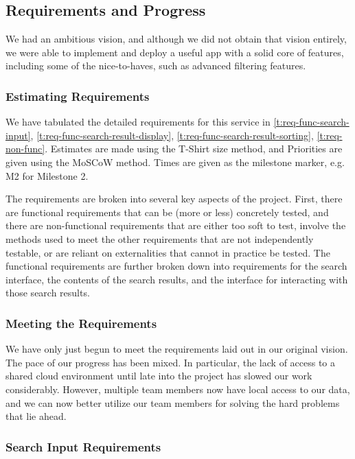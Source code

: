 \subsection{Requirements and Progress}

We had an ambitious vision, and although we did not obtain that vision entirely, we were able to implement and deploy a useful app with a solid core of features, including some of the nice-to-haves, such as advanced filtering features.

\subsubsection{Estimating Requirements}

We have tabulated the detailed requirements for this service in \autoref{t:req-func-search-input}, \autoref{t:req-func-search-result-display}, \autoref{t:req-func-search-result-sorting}, \autoref{t:req-non-func}. Estimates are made using the T-Shirt size method, and Priorities are given using the MoSCoW method. Times are given as the milestone marker, e.g. M2 for Milestone 2.

The requirements are broken into several key aspects of the project. First, there are functional requirements that can be (more or less) concretely tested, and there are non-functional requirements that are either too soft to test, involve the methods used to meet the other requirements that are not independently testable, or are reliant on externalities that cannot in practice be tested. The functional requirements are further broken down into requirements for the search interface, the contents of the search results, and the interface for interacting with those search results.

\subsubsection{Meeting the Requirements}

We have only just begun to meet the requirements laid out in our original vision. The pace of our progress has been mixed. In particular, the lack of access to a shared cloud environment until late into the project has slowed our work considerably. However, multiple team members now have local access to our data, and we can now better utilize our team members for solving the hard problems that lie ahead.

\def\requirementwidth{11.3cm}
\def\matrixwidth{1.3cm}

\subsubsection{Search Input Requirements}

